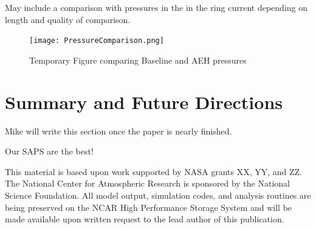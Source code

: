 \documentclass[draft,jgrga]{agutex}
\begin{document}
\begin{article}
 
 May include a comparison with pressures in the in the ring current depending on length and quality of comparison.
 
\begin{figure}[t]
\noindent\texttt{[image: PressureComparison.png]}
\caption{\label{press-fig}
Temporary Figure comparing Baseline and AEH pressures}
\end{figure}


 \section{Summary and Future Directions}
\label{sec-future}

Mike will write this section once the paper is nearly finished.

Our SAPS are the best!



%
%
%
%
%
%
%

\begin{acknowledgments}
This material is based upon work supported by NASA grants XX, YY, and ZZ.  The National Center for Atmospheric Research is sponsored by the National Science Foundation.  All model output, simulation codes, and analysis routines are being preserved on the NCAR High Performance Storage System and will be made available upon written request to the lead author of this publication. 
\end{acknowledgments}


\end{article}
\end{document}
